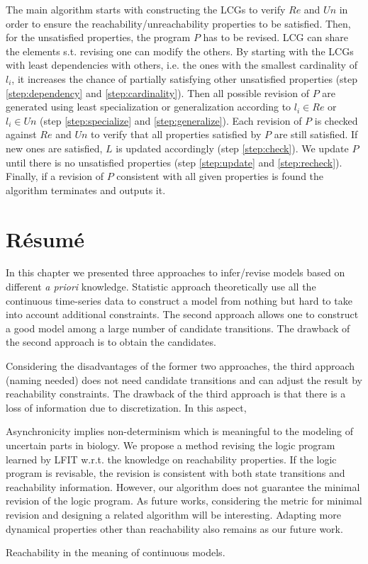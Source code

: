       
    The main algorithm starts with constructing the LCGs to verify $Re$ and $Un$ in order to ensure the reachability/unreachability properties to be satisfied.
    Then, for the unsatisfied properties, the program $P$ has to be revised.
    LCG can share the elements s.t. revising one can modify the others.
    By starting with the LCGs with least dependencies with others, i.e. the ones with the smallest cardinality of $l_i$, it increases the chance of partially satisfying other unsatisfied properties (step \ref{step:dependency} and \ref{step:cardinality}). 
    Then all possible revision of $P$ are generated using least specialization or generalization according to $l_i\in Re$ or $l_i \in Un$ (step \ref{step:specialize} and \ref{step:generalize}). 
    Each revision of $P$ is checked against $Re$ and $Un$ to verify that all properties satisfied by $P$ are still satisfied. 
    If new ones are satisfied, $L$ is updated accordingly (step \ref{step:check}).
    We update $P$ until there is no unsatisfied properties (step \ref{step:update} and \ref{step:recheck}).
    Finally, if a revision of $P$ consistent with all given properties is found the algorithm terminates and outputs it.
    
\section{R\'esum\'e}
In this chapter we presented three approaches to infer/revise models based on different \textit{a priori} knowledge.
Statistic approach theoretically use all the continuous time-series data to construct a model from nothing but hard to take into account additional constraints.
The second approach allows one to construct a good model among a large number of candidate transitions.
The drawback of the second approach is to obtain the candidates.

Considering the disadvantages of the former two approaches, the third approach (naming needed) does not need candidate transitions and can adjust the result by reachability constraints.
The drawback of the third approach is that there is a loss of information due to discretization.
In this aspect, 

Asynchronicity implies non-determinism which is meaningful to the modeling of uncertain parts in biology.
We propose a method revising the logic program learned by LFIT w.r.t. the knowledge on reachability properties. If the logic program is revisable, the revision is consistent with both state transitions and reachability information.
However, our algorithm does not guarantee the minimal revision of the logic program.
As future works, considering the metric for minimal revision and designing a related algorithm will be interesting.
Adapting more dynamical properties other than reachability also remains as our future work.

Reachability in the meaning of continuous models.